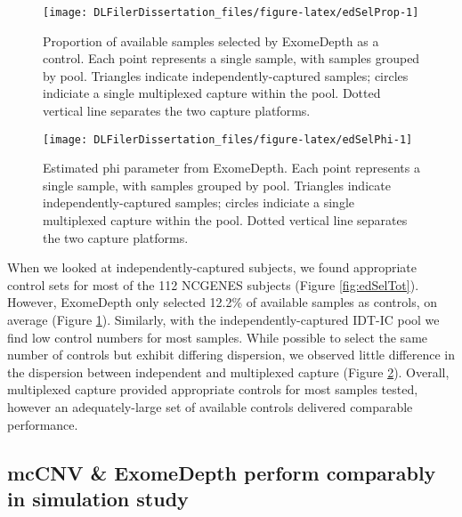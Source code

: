 \documentclass[11pt,letterpaper,oneside]{book}
\begin{document}
\begin{figure}

{\centering \texttt{[image: DLFilerDissertation\_files/figure-latex/edSelProp-1]} 

}

\caption[Proportion of available samples selected by ExomeDepth as a control.]{Proportion of available samples selected by ExomeDepth as a control. Each point represents a single sample, with samples grouped by pool. Triangles indicate independently-captured samples; circles indiciate a single multiplexed capture within the pool. Dotted vertical line separates the two capture platforms.}\label{fig:edSelProp}
\end{figure}



\begin{figure}

{\centering \texttt{[image: DLFilerDissertation\_files/figure-latex/edSelPhi-1]} 

}

\caption[Estimated phi parameter from ExomeDepth.]{Estimated phi parameter from ExomeDepth. Each point represents a single sample, with samples grouped by pool. Triangles indicate independently-captured samples; circles indiciate a single multiplexed capture within the pool. Dotted vertical line separates the two capture platforms.}\label{fig:edSelPhi}
\end{figure}

When we looked at independently-captured subjects, we found appropriate control sets for most of the 112 NCGENES subjects (Figure \ref{fig:edSelTot}).
However, ExomeDepth only selected 12.2\% of available samples as controls, on average (Figure \ref{fig:edSelProp}).
Similarly, with the independently-captured IDT-IC pool we find low control numbers for most samples.
While possible to select the same number of controls but exhibit differing dispersion, we observed little difference in the dispersion between independent and multiplexed capture (Figure \ref{fig:edSelPhi}).
Overall, multiplexed capture provided appropriate controls for most samples tested, however an adequately-large set of available controls delivered comparable performance.

\hypertarget{mccnv-exomedepth-perform-comparably-in-simulation-study}{%
\subsection{mcCNV \& ExomeDepth perform comparably in simulation study}\label{mccnv-exomedepth-perform-comparably-in-simulation-study}}
\end{document}
